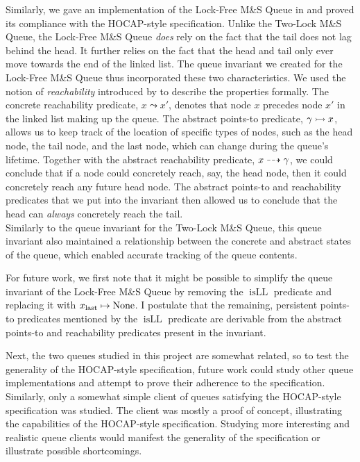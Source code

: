 \documentclass[a4paper, 10pt]{report}
\theoremstyle{definition}
\newcommand{\msq}{M\&S Queue}
\newcommand{\tlmsq}{Two-Lock \msq{}}
\newcommand{\lfmsq}{Lock-Free \msq{}}
\newcommand{\isLL}{\operatorname{isLL}}
\newcommand{\node}{x}
\newcommand{\nodeN}[1]{\node_{\mathrm{#1}}}
\newcommand{\nodelast}{\nodeN{last}}
\newcommand{\reach}[2]{#1 \leadsto #2}
\newcommand{\ar}[2]{#1 \dashrightarrow #2}
\newcommand{\ap}[2]{#1 \rightarrowtail #2}
\begin{document}
Similarly, we gave an implementation of the \lfmsq{} in \heaplang{} and proved its compliance with the HOCAP-style specification. Unlike the \tlmsq{}, the \lfmsq{} \emph{does} rely on the fact that the tail does not lag behind the head. It further relies on the fact that the head and tail only ever move towards the end of the linked list. The queue invariant we created for the \lfmsq{} thus incorporated these two characteristics. We used the notion of \textit{reachability} introduced by \citet{DBLP:conf/cpp/VindumB21} to describe the properties formally. The concrete reachability predicate, $\reach{\node}{\node'}$, denotes that node $\node$ precedes node $\node'$ in the linked list making up the queue. The abstract points-to predicate, $\ap{\gname}{\node}$, allows us to keep track of the location of specific types of nodes, such as the head node, the tail node, and the last node, which can change during the queue's lifetime. Together with the abstract reachability predicate, $\ar{\node}{\gname}$, we could conclude that if a node could concretely reach, say, the head node, then it could concretely reach any future head node. The abstract points-to and reachability predicates that we put into the invariant then allowed us to conclude that the head can \emph{always} concretely reach the tail.\\
Similarly to the queue invariant for the \tlmsq{}, this queue invariant also maintained a relationship between the concrete and abstract states of the queue, which enabled accurate tracking of the queue contents.

For future work, we first note that it might be possible to simplify the queue invariant of the \lfmsq{} by removing the $\isLL$ predicate and replacing it with $\nodelast \mapsto \None$. I postulate that the remaining, persistent points-to predicates mentioned by the $\isLL$ predicate are derivable from the abstract points-to and reachability predicates present in the invariant.

Next, the two queues studied in this project are somewhat related, so to test the generality of the HOCAP-style specification, future work could study other queue implementations and attempt to prove their adherence to the specification. Similarly, only a somewhat simple client of queues satisfying the HOCAP-style specification was studied. The client was mostly a proof of concept, illustrating the capabilities of the HOCAP-style specification. Studying more interesting and realistic queue clients would manifest the generality of the specification or illustrate possible shortcomings.
\end{document}
